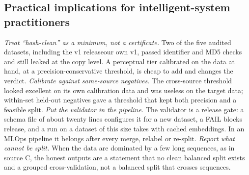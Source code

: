 \documentclass[review,12pt]{elsarticle}
\newcommand{\anonor}[2]{\ifdefined\ANON#1\else#2\fi}
\begin{document}
\subsection{Practical implications for intelligent-system practitioners}
\label{sec:implications}
\emph{Treat ``hash-clean'' as a minimum, not a certificate.} Two of
the five audited datasets, including \anonor{the v1 release}{our own v1}, passed identifier and
MD5 checks and still leaked at the copy level. A perceptual tier
calibrated on the data at hand, at a precision-conservative threshold,
is cheap to add and changes the verdict.
\emph{Calibrate against same-source negatives.} The cross-source
threshold looked excellent on its own calibration data and was useless
on the target data; within-set held-out negatives gave a threshold
that kept both precision and a feasible split.
\emph{Put the validator in the pipeline.} The validator is a release
gate: a schema file of about twenty lines configures it for a new
dataset, a FAIL blocks release, and a run on a dataset of this size
takes \nvalidatorRuntime{} with cached embeddings. In an MLOps
pipeline it belongs after every merge, relabel or re-split.
\emph{Report what cannot be split.} When the data are dominated by a
few long sequences, as in source C, the honest outputs are a statement
that no clean balanced split exists and a grouped cross-validation,
not a balanced split that crosses sequences.

\end{document}
